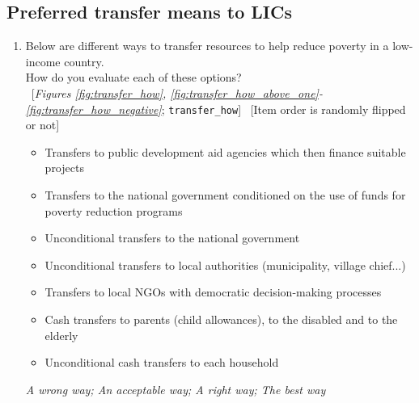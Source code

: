 \subsection*{Preferred transfer means to LICs} 
 \begin{enumerate}[resume] 
\item  \label{q:transfer_how} Below are different ways to transfer resources to help reduce poverty in a low-income country.~\\How do you evaluate each of these options?\\ 
~[\textit{Figures \ref{fig:transfer_how}, \ref{fig:transfer_how_above_one}-\ref{fig:transfer_how_negative}}; 
\verb|transfer_how|]
~[Item order is randomly flipped or not]
\begin{itemize}
  \item Transfers to public development aid agencies which then finance suitable projects
  \item Transfers to the national government conditioned on the use of funds for poverty reduction programs
  \item Unconditional transfers to the national government
  \item Unconditional transfers to local authorities (municipality, village chief...)
  \item Transfers to local NGOs with democratic decision-making processes
  \item Cash transfers to parents (child allowances), to the disabled and to the elderly
  \item Unconditional cash transfers to each household
\end{itemize}
\textit{A wrong way; An acceptable way; A right way; The best way}

\end{enumerate} 

